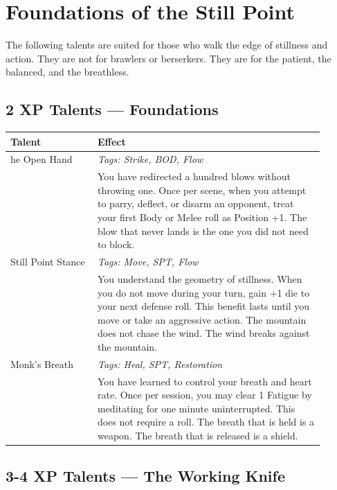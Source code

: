 \documentclass[11pt]{book}
\newenvironment{traittable}[1]
  {\begin{supertabular}{p{0.25\linewidth}p{0.65\linewidth}} \hline \textbf{Talent} & \textbf{Effect} \\ \hline}
  {\end{supertabular}}
\begin{document}
\chapter{Foundations of the Still Point}

The following talents are suited for those who walk the edge of stillness and action. They are not for brawlers or berserkers. They are for the patient, the balanced, and the breathless.

\section{2 XP Talents --- Foundations}

\begin{traittable}
The Open Hand & \textit{Tags: Strike, BOD, Flow} \\
& You have redirected a hundred blows without throwing one. Once per scene, when you attempt to parry, deflect, or disarm an opponent, treat your first Body or Melee roll as Position +1. The blow that never lands is the one you did not need to block. \\
Still Point Stance & \textit{Tags: Move, SPT, Flow} \\
& You understand the geometry of stillness. When you do not move during your turn, gain +1 die to your next defense roll. This benefit lasts until you move or take an aggressive action. The mountain does not chase the wind. The wind breaks against the mountain. \\
Monk's Breath & \textit{Tags: Heal, SPT, Restoration} \\
& You have learned to control your breath and heart rate. Once per session, you may clear 1 Fatigue by meditating for one minute uninterrupted. This does not require a roll. The breath that is held is a weapon. The breath that is released is a shield.
\end{traittable}

\section{3-4 XP Talents --- The Working Knife}
\end{document}

